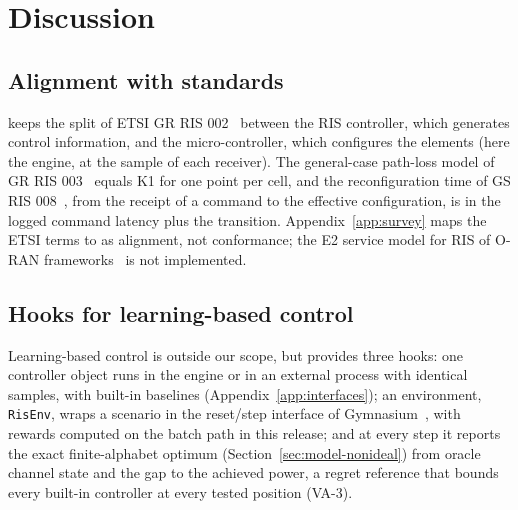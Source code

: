 \section{Discussion}\label{sec:discussion}

\subsection{Alignment with standards}\label{sec:disc-standards}
\sremu{} keeps the split of ETSI GR RIS 002~\cite{ETSI_GR_RIS002_v121}
between the RIS controller, which generates control information, and the micro-controller,
which configures the elements (here the engine, at the sample of each receiver). The
general-case path-loss model of GR RIS 003~\cite{ETSI_GR_RIS003_v121} equals K1 for one point
per cell, and the reconfiguration time of GS RIS 008~\cite{ETSI_GS_RIS008}, from the receipt
of a command to the effective configuration, is in \sremu{} the logged command latency plus the
transition. Appendix~\ref{app:survey} maps the ETSI terms to \sremu{} as alignment, not
conformance; the E2 service model for RIS of O-RAN
frameworks~\cite{ElGhalbzouri2025GoSimRIS,Kayraklik2026ORIX} is not implemented.

\subsection{Hooks for learning-based control}\label{sec:disc-ml}
Learning-based control is outside our scope, but \sremu{} provides
three hooks: one controller object runs in the engine or in an external process with identical
samples, with built-in baselines (Appendix~\ref{app:interfaces});
an environment, \texttt{RisEnv}, wraps a scenario in the reset/step interface
of Gymnasium~\cite{Towers2024Gymnasium}, with rewards computed on the batch path in this
release; and at every step it reports the exact finite-alphabet optimum
(Section~\ref{sec:model-nonideal}) from oracle channel state and the gap to the achieved power,
a regret reference that bounds every built-in controller at every tested position (VA-3).

